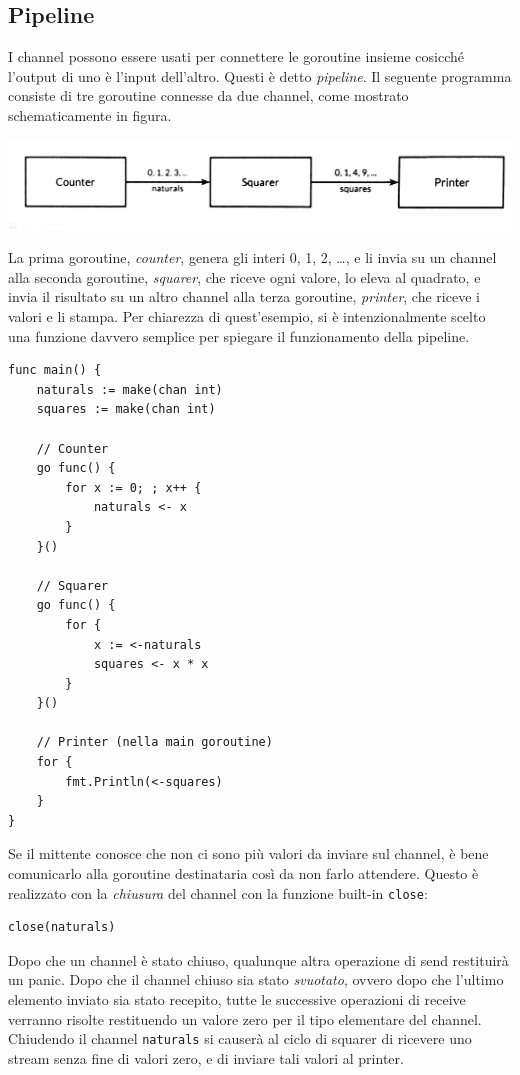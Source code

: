 \subsection{Pipeline}
\label{subsec:pipeline}%
I channel possono essere usati per connettere le goroutine insieme cosicché l'output di uno è l'input dell'altro.
Questi è detto \textit{pipeline}.
Il seguente programma consiste di tre goroutine connesse da due channel, come mostrato schematicamente in figura.
\begin{center}
    \includegraphics[width=0.8\linewidth]{figures/figure7.1}
\end{center}
La prima goroutine, \textit{counter}, genera gli interi 0, 1, 2, \ldots, e li invia su un channel alla seconda goroutine, \textit{squarer}, che riceve ogni valore, lo eleva al quadrato, e invia il risultato su un altro channel alla terza goroutine, \textit{printer}, che riceve i valori e li stampa.
Per chiarezza di quest'esempio, si è intenzionalmente scelto una funzione davvero semplice per spiegare il funzionamento della pipeline.
\begin{lstlisting}[frame=single, label={lst:lstlisting7-4-2.1}]
func main() {
    naturals := make(chan int)
    squares := make(chan int)

    // Counter
    go func() {
        for x := 0; ; x++ {
            naturals <- x
        }
    }()

    // Squarer
    go func() {
        for {
            x := <-naturals
            squares <- x * x
        }
    }()

    // Printer (nella main goroutine)
    for {
        fmt.Println(<-squares)
    }
}
\end{lstlisting}
Se il mittente conosce che non ci sono più valori da inviare sul channel, è bene comunicarlo alla goroutine destinataria così da non farlo attendere.
Questo è realizzato con la \textit{chiusura} del channel con la funzione built-in \verb|close|:
\begin{lstlisting}[frame=single, label={lst:lstlisting7-4-2.2}]
close(naturals)
\end{lstlisting}
Dopo che un channel è stato chiuso, qualunque altra operazione di send restituirà un panic.
Dopo che il channel chiuso sia stato \textit{svuotato}, ovvero dopo che l'ultimo elemento inviato sia stato recepito, tutte le successive operazioni di receive verranno risolte restituendo un valore zero per il tipo elementare del channel.
Chiudendo il channel \verb|naturals| si causerà al ciclo di squarer di ricevere uno stream senza fine di valori zero, e di inviare tali valori al printer.

